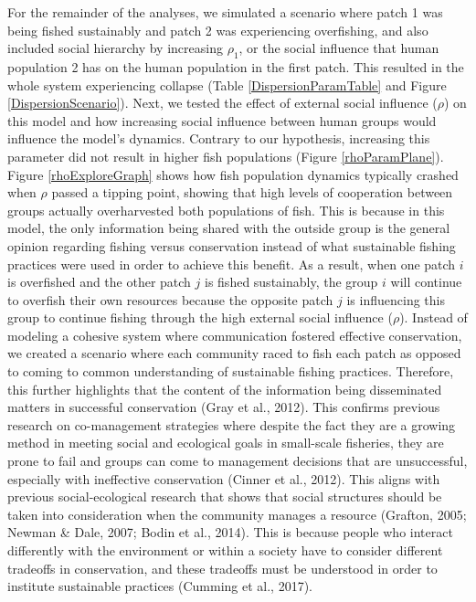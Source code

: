 \documentclass[
  12pt,
]{article}
\begin{document}
For the remainder of the analyses, we simulated a scenario where patch 1 was being fished sustainably and patch 2 was experiencing overfishing, and also included social hierarchy by increasing \(\rho_1\), or the social influence that human population 2 has on the human population in the first patch. This resulted in the whole system experiencing collapse (Table \ref{DispersionParamTable} and Figure \ref{DispersionScenario}). Next, we tested the effect of external social influence (\(\rho\)) on this model and how increasing social influence between human groups would influence the model's dynamics. Contrary to our hypothesis, increasing this parameter did not result in higher fish populations (Figure \ref{rhoParamPlane}). Figure \ref{rhoExploreGraph} shows how fish population dynamics typically crashed when \(\rho\) passed a tipping point, showing that high levels of cooperation between groups actually overharvested both populations of fish. This is because in this model, the only information being shared with the outside group is the general opinion regarding fishing versus conservation instead of what sustainable fishing practices were used in order to achieve this benefit. As a result, when one patch \(i\) is overfished and the other patch \(j\) is fished sustainably, the group \(i\) will continue to overfish their own resources because the opposite patch \(j\) is influencing this group to continue fishing through the high external social influence (\(\rho\)). Instead of modeling a cohesive system where communication fostered effective conservation, we created a scenario where each community raced to fish each patch as opposed to coming to common understanding of sustainable fishing practices. Therefore, this further highlights that the content of the information being disseminated matters in successful conservation (Gray et al., 2012). This confirms previous research on co-management strategies where despite the fact they are a growing method in meeting social and ecological goals in small-scale fisheries, they are prone to fail and groups can come to management decisions that are unsuccessful, especially with ineffective conservation (Cinner et al., 2012). This aligns with previous social-ecological research that shows that social structures should be taken into consideration when the community manages a resource (Grafton, 2005; Newman \& Dale, 2007; Bodin et al., 2014). This is because people who interact differently with the environment or within a society have to consider different tradeoffs in conservation, and these tradeoffs must be understood in order to institute sustainable practices (Cumming et al., 2017).
\end{document}
